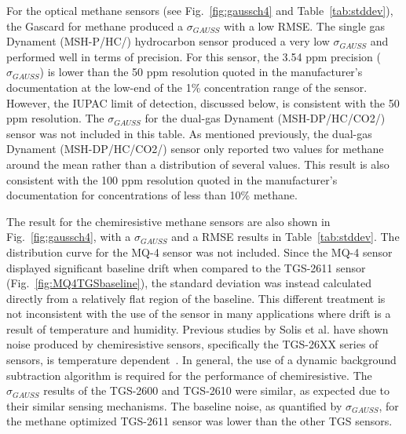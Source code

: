 \documentclass[times]{joehreview}
\begin{document}
	For the optical methane sensors (see Fig.~\ref{fig:gaussch4} and Table~\ref{tab:stddev}), the Gascard for methane produced a $\sigma_{GAUSS}$ with a low RMSE. The single gas Dynament (MSH-P/HC/) hydrocarbon sensor produced a very low $\sigma_{GAUSS}$ and performed well in terms of precision.  For this sensor, the 3.54 ppm precision ($\sigma_{GAUSS}$) is lower than the 50 ppm resolution quoted in the manufacturer's documentation at the low-end of the 1\% concentration range of the sensor.  However, the IUPAC limit of detection, discussed below, is consistent with the 50 ppm resolution.  The $\sigma_{GAUSS}$ for the dual-gas Dynament (MSH-DP/HC/CO2/) sensor was not included in this table.  As mentioned previously, the dual-gas Dynament (MSH-DP/HC/CO2/) sensor only reported two values for methane around the mean rather than a distribution of several values.  This result is also consistent with the 100 ppm resolution quoted in the manufacturer's documentation for concentrations of less than 10\% methane.  
	
	The result for the chemiresistive methane sensors are also shown in Fig.~\ref{fig:gaussch4}, with a $\sigma_{GAUSS}$ and a RMSE results in Table~\ref{tab:stddev}.  The distribution curve for the MQ-4 sensor was not included.  Since the MQ-4 sensor displayed significant baseline drift when compared to the TGS-2611 sensor (Fig.~\ref{fig:MQ4TGSbaseline}), the standard deviation was instead calculated directly from a relatively flat region of the baseline.  This different treatment is not inconsistent with the use of the sensor in many applications where drift is a result of temperature and humidity.  Previous studies by Solis et al. have shown noise produced by chemiresistive sensors, specifically the TGS-26XX series of sensors, is temperature dependent~\cite{solis_fluctuation-enhanced_2005}. In general, the use of a dynamic background subtraction algorithm is required for the performance of chemiresistive.  The $\sigma_{GAUSS}$ results of the TGS-2600 and TGS-2610 were similar, as expected due to their similar sensing mechanisms.  The baseline noise, as quantified by $\sigma_{GAUSS}$, for the methane optimized TGS-2611 sensor was lower than the other TGS sensors.
	
\end{document}
